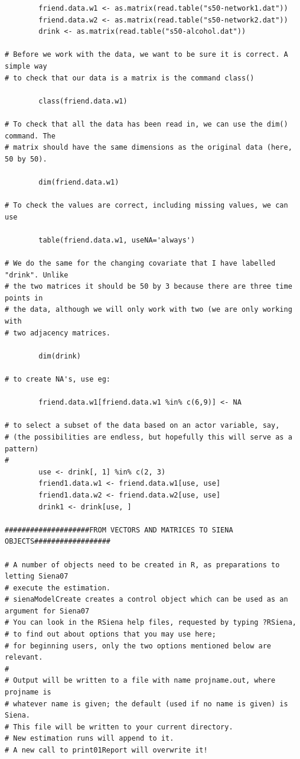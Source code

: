 \documentclass[a4paper,fleqn]{article}
\newcommand{\+}{\, + \,}
\begin{document}
{\begin{verbatim}
        friend.data.w1 <- as.matrix(read.table("s50-network1.dat"))
        friend.data.w2 <- as.matrix(read.table("s50-network2.dat"))
        drink <- as.matrix(read.table("s50-alcohol.dat"))

# Before we work with the data, we want to be sure it is correct. A simple way
# to check that our data is a matrix is the command class()

        class(friend.data.w1)

# To check that all the data has been read in, we can use the dim() command. The
# matrix should have the same dimensions as the original data (here, 50 by 50).

        dim(friend.data.w1)

# To check the values are correct, including missing values, we can use

        table(friend.data.w1, useNA='always')

# We do the same for the changing covariate that I have labelled "drink". Unlike
# the two matrices it should be 50 by 3 because there are three time points in
# the data, although we will only work with two (we are only working with
# two adjacency matrices.

        dim(drink)

# to create NA's, use eg:

        friend.data.w1[friend.data.w1 %in% c(6,9)] <- NA

# to select a subset of the data based on an actor variable, say,
# (the possibilities are endless, but hopefully this will serve as a pattern)
#
        use <- drink[, 1] %in% c(2, 3)
        friend1.data.w1 <- friend.data.w1[use, use]
        friend1.data.w2 <- friend.data.w2[use, use]
        drink1 <- drink[use, ]

####################FROM VECTORS AND MATRICES TO SIENA OBJECTS##################

# A number of objects need to be created in R, as preparations to letting Siena07
# execute the estimation.
# sienaModelCreate creates a control object which can be used as an argument for Siena07
# You can look in the RSiena help files, requested by typing ?RSiena,
# to find out about options that you may use here;
# for beginning users, only the two options mentioned below are relevant.
#
# Output will be written to a file with name projname.out, where projname is
# whatever name is given; the default (used if no name is given) is Siena.
# This file will be written to your current directory.
# New estimation runs will append to it.
# A new call to print01Report will overwrite it!


\end{verbatim}}
\end{document}
